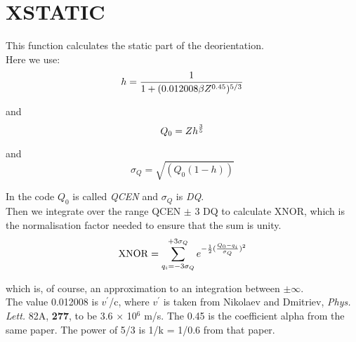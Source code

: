 \section{XSTATIC}
\label{sect:xstatic}

\noindent This function calculates the static part of the deorientation.\\

\noindent Here we use:\\

\begin{equation}
h = {1 \over {1 + (0.012008 \beta Z^{0.45})^{5/3}}}
\end{equation}

\noindent and\\

\begin{equation}
Q_0 = Z h^{3 \over 5}
\end{equation}

\noindent and\\

\begin{equation}
\sigma_Q = \sqrt{(Q_0 (1 - h))}
\end{equation}

\noindent In the code $Q_0$ is called {\em QCEN} and $\sigma_Q$ is {\em
DQ}.\\

\noindent Then we integrate over the range QCEN $\pm$ 3 DQ to
calculate XNOR, which is the normalisation factor needed to ensure that the
sum is unity.\\

\begin{equation}
\mathrm{XNOR} = \sum_{q_i=-3\sigma_Q}^{+3\sigma_Q} e^{-{1\over 2} ({Q_0 - q_i \over
\sigma_Q})^2}
\end{equation}

\noindent which is, of course, an approximation to an integration between
$\pm\infty$.\\


\noindent The value 0.012008 is $v^\prime$/c, where $v^\prime$ is taken from
Nikolaev and Dmitriev, {\em Phys. Lett.} 82A, {\bf 277}, to be 3.6 $\times$
10$^6$ m/s. The 0.45 is the coefficient alpha from the same paper. The power
of 5/3 is 1/k = 1/0.6 from that paper.
